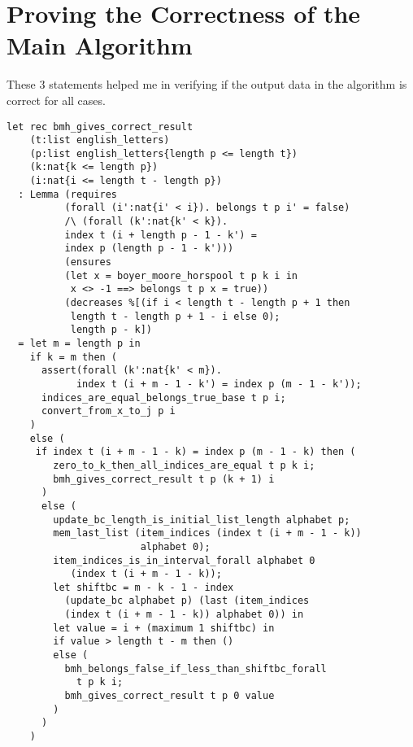 \section{Proving the Correctness of the Main Algorithm}

These \(3\) statements helped me in verifying if the output data in the algorithm is correct for all cases.

\begin{verbatim}
let rec bmh_gives_correct_result 
    (t:list english_letters) 
    (p:list english_letters{length p <= length t})
    (k:nat{k <= length p})
    (i:nat{i <= length t - length p})
  : Lemma (requires
          (forall (i':nat{i' < i}). belongs t p i' = false)
          /\ (forall (k':nat{k' < k}). 
          index t (i + length p - 1 - k') = 
          index p (length p - 1 - k')))
          (ensures 
          (let x = boyer_moore_horspool t p k i in 
           x <> -1 ==> belongs t p x = true))
          (decreases %[(if i < length t - length p + 1 then
           length t - length p + 1 - i else 0); 
           length p - k])
  = let m = length p in
    if k = m then (
      assert(forall (k':nat{k' < m}).
            index t (i + m - 1 - k') = index p (m - 1 - k'));
      indices_are_equal_belongs_true_base t p i;
      convert_from_x_to_j p i
    )
    else (
     if index t (i + m - 1 - k) = index p (m - 1 - k) then (
        zero_to_k_then_all_indices_are_equal t p k i;
        bmh_gives_correct_result t p (k + 1) i
      )
      else (
        update_bc_length_is_initial_list_length alphabet p;
        mem_last_list (item_indices (index t (i + m - 1 - k))
                       alphabet 0);
        item_indices_is_in_interval_forall alphabet 0
           (index t (i + m - 1 - k));
        let shiftbc = m - k - 1 - index 
          (update_bc alphabet p) (last (item_indices 
          (index t (i + m - 1 - k)) alphabet 0)) in
        let value = i + (maximum 1 shiftbc) in 
        if value > length t - m then ()
        else (
          bmh_belongs_false_if_less_than_shiftbc_forall
            t p k i;
          bmh_gives_correct_result t p 0 value
        )
      )
    )


\end{verbatim}
